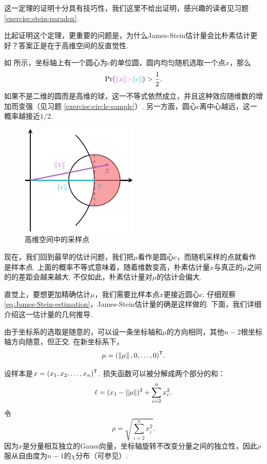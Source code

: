 这一定理的证明十分具有技巧性，我们这里不给出证明，感兴趣的读者见习题 \ref{exercise:stein-paradox}.

比起证明这个定理，更重要的问题是，为什么James-Stein估计量会比朴素估计更好？答案正是在于高维空间的反直觉性. 

如 所示，坐标轴上有一个圆心为$c$的单位圆，圆内均匀随机选取一个点$x$，那么
\[
\Pr(\light{\norm{x}} \textcolor{Salmon}{>} \contrastlight{\norm{c}}) > \frac{1}{2}.
\]
如果不是二维的圆而是高维的球，这一不等式依然成立，并且这种效应随维数的增加而变强（见习题 \ref{exercise:circle-sample}）. 另一方面，圆心$c$离中心越远，这一概率越接近$1/2$. 

\begin{figure}[ht]
    \centering
    \includegraphics[width=0.5\textwidth]{figures/J-L-lemma/stein.pdf}
    \caption{高维空间中的采样点}
    \label{fig:circle-sample}
\end{figure}

现在，我们回到最早的估计问题，我们把$\mu$看作是圆心$c$，而随机采样的点就看作是样本点. 上面的概率不等式意味着，随着维数变高，朴素估计量$x$与真正的$\mu$之间的的差距会越来越大. 不仅如此，朴素估计量对$\mu$的估计会偏大. 

直觉上，要想更加精确估计$\mu$，我们需要比样本点$x$更接近圆心$c$. 仔细观察 \eqref{eq:James-Stein-estimation}，James-Stein估计量的确是这样做的. 下面，我们详细介绍这一估计量的几何推导. 

由于坐标系的选取是随意的，可以设一条坐标轴和$\mu$的方向相同，其他$n-2$根坐标轴方向随意，但正交. 在新坐标系下，
\[\mu = (\left\|\mu\right\|,0,\dots,0)^{\mathsf{T}}.\] 

设样本是$x=(x_1,x_2,\dots,x_n)^{\mathsf{T}}$. 损失函数可以被分解成两个部分的和：
\begin{equation}
    \ell=(x_1-\left\|\mu\right\|)^2+\sum_{i=2}^nx_i^2. \label{eq:loss-decomposition}
\end{equation}
令
\[\rho = \sqrt{\sum_{i=2}^n x_i^2}.\]
因为$x$是分量相互独立的Gauss向量，坐标轴旋转不改变分量之间的独立性，因此$\rho$服从自由度为$n-1$的$\chi$分布（可参见）. 

